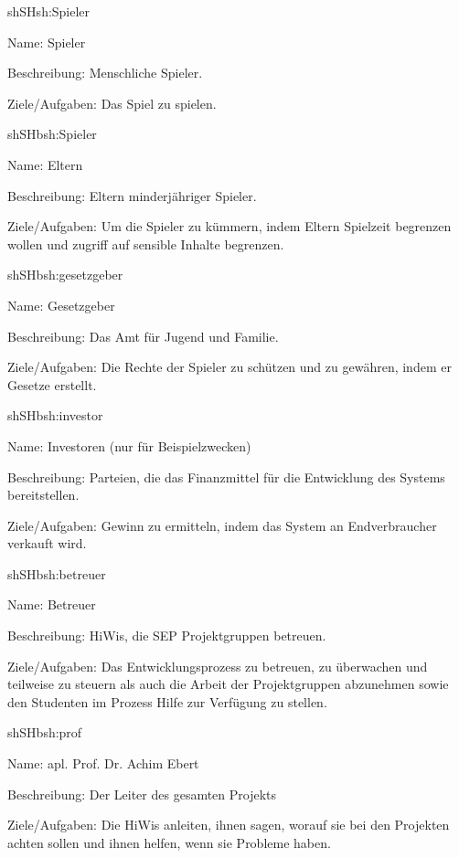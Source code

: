 \begin{description}[leftmargin=5em, style=sameline]
	
	\begin{lhp}{sh}{SH}{sh:Spieler}
		\item [Name:] Spieler
		\item [Beschreibung:] Menschliche Spieler.
		\item [Ziele/Aufgaben:] Das Spiel zu spielen.
	\end{lhp}
	
	\begin{lhp}{sh}{SH}{bsh:Spieler}
		\item [Name:] Eltern
		\item [Beschreibung:] Eltern minderjähriger Spieler.
		\item [Ziele/Aufgaben:] Um die Spieler zu kümmern, indem Eltern Spielzeit begrenzen wollen und zugriff auf sensible Inhalte begrenzen.
	\end{lhp}
	
	\begin{lhp}{sh}{SH}{bsh:gesetzgeber}
		\item [Name:] Gesetzgeber
		\item [Beschreibung:] Das Amt für Jugend und Familie.
		\item [Ziele/Aufgaben:] Die Rechte der Spieler zu schützen und zu gewähren, indem er Gesetze erstellt.
	\end{lhp}
	
	\begin{lhp}{sh}{SH}{bsh:investor}
		\item [Name:] Investoren (nur für Beispielzwecken)
		\item [Beschreibung:] Parteien, die das Finanzmittel für die Entwicklung des Systems bereitstellen.
		\item [Ziele/Aufgaben:] Gewinn zu ermitteln, indem das System an Endverbraucher verkauft wird.
	\end{lhp}
	
	\begin{lhp}{sh}{SH}{bsh:betreuer}
		\item [Name:] Betreuer
		\item [Beschreibung:] HiWis, die SEP Projektgruppen betreuen.
		\item [Ziele/Aufgaben:] Das Entwicklungsprozess zu betreuen, zu überwachen und teilweise zu steuern als auch die Arbeit der Projektgruppen abzunehmen sowie den Studenten im Prozess Hilfe zur Verfügung zu stellen. 
	\end{lhp}
	
	\begin{lhp}{sh}{SH}{bsh:prof}
		\item [Name:] apl. Prof. Dr. Achim Ebert
		\item [Beschreibung:] Der Leiter des gesamten Projekts
		\item [Ziele/Aufgaben:] Die HiWis anleiten, ihnen sagen, worauf sie bei den Projekten achten sollen und ihnen helfen, wenn sie Probleme haben.
	\end{lhp}
		
\end{description}

